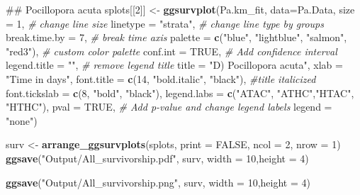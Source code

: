 \documentclass[]{article}
\newenvironment{Shaded}{\begin{snugshade}}{\end{snugshade}}
\newcommand{\KeywordTok}[1]{\textcolor[rgb]{0.13,0.29,0.53}{\textbf{#1}}}
\newcommand{\DataTypeTok}[1]{\textcolor[rgb]{0.13,0.29,0.53}{#1}}
\newcommand{\DecValTok}[1]{\textcolor[rgb]{0.00,0.00,0.81}{#1}}
\newcommand{\StringTok}[1]{\textcolor[rgb]{0.31,0.60,0.02}{#1}}
\newcommand{\CommentTok}[1]{\textcolor[rgb]{0.56,0.35,0.01}{\textit{#1}}}
\newcommand{\OtherTok}[1]{\textcolor[rgb]{0.56,0.35,0.01}{#1}}
\newcommand{\NormalTok}[1]{#1}
\begin{document}
\begin{Shaded}
\begin{Highlighting}[]
\NormalTok{## Pocillopora acuta}
\NormalTok{splots[[}\DecValTok{2}\NormalTok{]] <-}\StringTok{ }\KeywordTok{ggsurvplot}\NormalTok{(Pa.km_fit, }\DataTypeTok{data=}\NormalTok{Pa.Data, }\DataTypeTok{size =} \DecValTok{1}\NormalTok{,  }\CommentTok{# change line size}
           \DataTypeTok{linetype =} \StringTok{"strata"}\NormalTok{, }\CommentTok{# change line type by groups}
           \DataTypeTok{break.time.by =} \DecValTok{7}\NormalTok{, }\CommentTok{# break time axis}
           \DataTypeTok{palette =} \KeywordTok{c}\NormalTok{(}\StringTok{"blue"}\NormalTok{, }\StringTok{"lightblue"}\NormalTok{, }\StringTok{"salmon"}\NormalTok{, }\StringTok{"red3"}\NormalTok{), }\CommentTok{# custom color palette}
           \DataTypeTok{conf.int =} \OtherTok{TRUE}\NormalTok{, }\CommentTok{# Add confidence interval}
           \DataTypeTok{legend.title =} \StringTok{""}\NormalTok{, }\CommentTok{# remove legend title}
           \DataTypeTok{title =} \StringTok{"D) Pocillopora acuta"}\NormalTok{,}
           \DataTypeTok{xlab =} \StringTok{"Time in days"}\NormalTok{,}
           \DataTypeTok{font.title =} \KeywordTok{c}\NormalTok{(}\DecValTok{14}\NormalTok{, }\StringTok{"bold.italic"}\NormalTok{, }\StringTok{"black"}\NormalTok{), }\CommentTok{#title italicized}
           \DataTypeTok{font.tickslab =} \KeywordTok{c}\NormalTok{(}\DecValTok{8}\NormalTok{, }\StringTok{"bold"}\NormalTok{, }\StringTok{"black"}\NormalTok{),}
           \DataTypeTok{legend.labs =} \KeywordTok{c}\NormalTok{(}\StringTok{"ATAC"}\NormalTok{, }\StringTok{"ATHC"}\NormalTok{,}\StringTok{"HTAC"}\NormalTok{, }\StringTok{"HTHC"}\NormalTok{), }\DataTypeTok{pval =} \OtherTok{TRUE}\NormalTok{, }\CommentTok{# Add p-value and change legend labels}
           \DataTypeTok{legend =} \StringTok{"none"}\NormalTok{)}

\NormalTok{surv <-}\StringTok{ }\KeywordTok{arrange_ggsurvplots}\NormalTok{(splots, }\DataTypeTok{print =} \OtherTok{FALSE}\NormalTok{, }\DataTypeTok{ncol =} \DecValTok{2}\NormalTok{, }\DataTypeTok{nrow =} \DecValTok{1}\NormalTok{)}
\KeywordTok{ggsave}\NormalTok{(}\StringTok{"Output/All_survivorship.pdf"}\NormalTok{, surv, }\DataTypeTok{width =} \DecValTok{10}\NormalTok{,}\DataTypeTok{height =} \DecValTok{4}\NormalTok{)}

\KeywordTok{ggsave}\NormalTok{(}\StringTok{"Output/All_survivorship.png"}\NormalTok{, surv, }\DataTypeTok{width =} \DecValTok{10}\NormalTok{,}\DataTypeTok{height =} \DecValTok{4}\NormalTok{)}
\end{Highlighting}
\end{Shaded}
\end{document}

